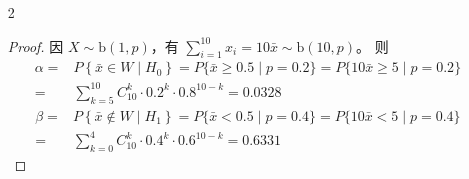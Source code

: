\documentclass[normal,founder,mtpro2,cn]{elegantnote}
\begin{document}
\begin{enumerate}
\begin{proof}
\begin{enumerate}
                      \begin{equation*}
                          \begin{aligned}
                              \alpha= & P\{\bar{x}\geq 2.6\mid\mu=2\}=P\left\{\frac{\bar{x}-\mu}{1/\sqrt{n}}\geq\frac{2.6-2}{1/\sqrt{n}}=0.6\sqrt{n}\right\} \\
                              =       & 1-\Phi(0.6\sqrt{n})\rightarrow 0,\quad n\rightarrow\infty
                          \end{aligned}
                      \end{equation*}
                      \begin{equation*}
                          \begin{aligned}
                              \beta= & P\{\bar{x}<2.6 \mid\mu=3\}=P\left\{\frac{\bar{x}-\mu}{1/\sqrt{n}}<\frac{2.6-3}{1/\sqrt{n}}=-0.4\sqrt{n}\right\} \\
                              =      & \Phi(-0.4\sqrt{n})\rightarrow 0,\quad n\rightarrow\infty
                          \end{aligned}
                      \end{equation*}
            \end{enumerate}
        \end{proof}
    \item[2]
        \begin{proof}
            因 $X\sim \text{b}(1,p)$，有 $\sum_{i=1}^{10}x_{i}=10\bar{x}\sim\text{b}(10,p)$。
            则
            \begin{equation*}
                \begin{aligned}
                    \alpha= & P\left\{\bar{x}\in W\mid H_{0}\right\}=P\{\bar{x}\geq 0.5\mid p=0.2\}=P\{10\bar{x}\geq 5\mid p=0.2\} \\
                    =       & \sum_{k=5}^{10}C_{10}^{k}\cdot 0.2^{k}\cdot 0.8^{10-k}=0.0328
                \end{aligned}
            \end{equation*}
            \begin{equation*}
                \begin{aligned}
                    \beta= & P\left\{\bar{x}\notin W\mid H_{1}\right\}=P\{\bar{x}<0.5\mid p=0.4\}=P\{10\bar{x}<5\mid p=0.4\} \\
                    =      & \sum_{k=0}^{4}C_{10}^{k}\cdot 0.4^{k}\cdot 0.6^{10-k}=0.6331
                \end{aligned}
            \end{equation*}

\end{proof}
\end{enumerate}
\end{document}
